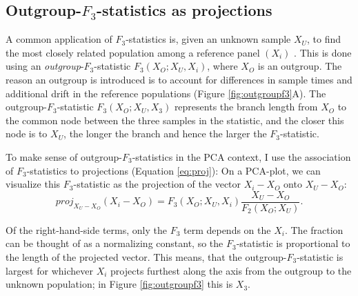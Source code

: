 \documentclass[12pt,fullpage, a4paper]{article}
\newcommand{\vectorproj}[2][]{\textit{proj}_{#1}#2}
\begin{document}
\subsection{Outgroup-$F_3$-statistics as projections}
A common application of $F_3$-statistics is, given an unknown sample $X_U$, to find the most closely related population among a reference panel $(X_i)$ \citep{raghavan2014}. This is done  using an \emph{outgroup}-$F_3$-statistic $F_3(X_O; X_U, X_i)$, where $X_O$ is an outgroup. The reason an outgroup is introduced is to account for differences in sample times and additional drift in the reference populations (Figure \ref{fig:outgroupf3}A). The outgroup-$F_3$-statistic $F_3(X_O; X_U, X_3)$ represents the branch length from $X_O$ to the common node between the three samples in the statistic, and the closer this node is to $X_U$, the longer the branch and hence the larger the $F_3$-statistic. 

To make sense of outgroup-$F_3$-statistics in the PCA context, I use the association of $F_3$-statistics to projections (Equation \ref{eq:proj}):
On a PCA-plot, we can visualize this $F_3$-statistic as the projection of the vector $X_i - X_O$ onto $X_U - X_O$: 
$$\vectorproj[X_U - X_O]{(X_i - X_O)} =F_3(X_O; X_U, X_i) \frac{X_U - X_O}{F_2(X_O; X_U)}.$$

Of the right-hand-side terms, only the $F_3$ term depends on the $X_i$. The fraction can be thought of as a normalizing constant,  so the $F_3$-statistic is proportional to the length of the projected vector. This means, that the outgroup-$F_3$-statistic is largest for whichever $X_i$ projects furthest along the axis from the outgroup to the unknown population; in Figure \ref{fig:outgroupf3} this is $X_3$.
\end{document}
